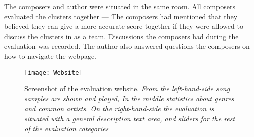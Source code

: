 \documentclass[../report.tex]{subfiles}
\begin{document}
The composers and author were situated in the same room. All composers evaluated the clusters together --- The composers had mentioned that they believed they can give a more accurate score together if they were allowed to discuss the clusters in as a team. Discussions the composers had during the evaluation was recorded. The author also answered questions the composers on how to navigate the webpage.



\begin{figure}[h!]
  \begin{center}
    \texttt{[image: Website]}
      \caption{Screenshot of the evaluation website. \newline
      \textit{From the left-hand-side song samples are shown and played, In the middle statistics about genres and common artists. On the right-hand-side the evaluation is situated with a general description text area, and sliders for the rest of the evaluation categories}}\label{fig:website}

  \end{center}
\end{figure}
\end{document}
